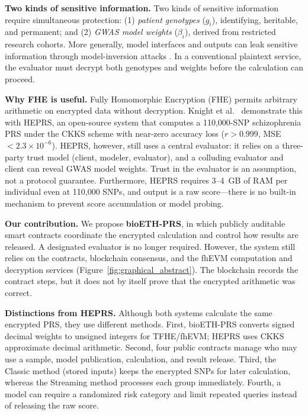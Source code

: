 \documentclass[10pt]{article}
\begin{document}
\textbf{Two kinds of sensitive information.}
Two kinds of sensitive information require simultaneous protection: (1)
\emph{patient genotypes} ($g_i$), identifying, heritable, and permanent; and
(2) \emph{GWAS model weights} ($\beta_i$), derived from restricted research cohorts.
More generally, model interfaces and outputs can leak sensitive information through
model-inversion attacks \citep{fredrikson2015modelinversion}.
In a conventional plaintext service, the evaluator must decrypt both genotypes and
weights before the calculation can proceed.

\textbf{Why FHE is useful.}
Fully Homomorphic Encryption (FHE) permits arbitrary arithmetic on encrypted data
without decryption.  Knight et al.\ \citep{knight2026heprs} demonstrate this with
HEPRS, an open-source system that computes a 110,000-SNP schizophrenia PRS under
the CKKS scheme \citep{cheon2017ckks} with near-zero accuracy loss ($r > 0.999$,
MSE~$< 2.3 \times 10^{-6}$).  HEPRS, however, still uses a central evaluator:
it relies on a three-party trust model (client, modeler, evaluator), and a colluding
evaluator and client can reveal GWAS model weights.  Trust in the evaluator is an
assumption, not a protocol guarantee.  Furthermore, HEPRS requires 3--4~GB of RAM
per individual even at 110,000 SNPs, and output is a raw score---there is no built-in
mechanism to prevent score accumulation or model probing.

\textbf{Our contribution.}
We propose \textbf{bioETH-PRS}, in which publicly auditable smart contracts coordinate
the encrypted calculation and control how results are released.  A designated
evaluator is no longer required.  However, the system still relies
on the contracts, blockchain consensus, and the fhEVM computation and decryption
services (Figure~\ref{fig:graphical_abstract}).  The blockchain records the contract
steps, but it does not by itself prove that the encrypted arithmetic was correct.

\smallskip\noindent\textbf{Distinctions from HEPRS.}
Although both systems calculate the same encrypted PRS, they use different methods.
First, bioETH-PRS converts signed decimal weights to unsigned integers for TFHE/fhEVM;
HEPRS uses CKKS approximate decimal arithmetic.  Second, four public contracts manage
who may use a sample, model publication, calculation, and result release.  Third, the
Classic method (stored inputs) keeps the encrypted SNPs for later calculation, whereas the Streaming
method processes each group immediately.  Fourth, a model can require a randomized
risk category and limit repeated queries instead of releasing the raw score.
\end{document}
